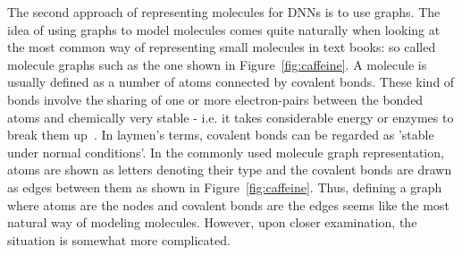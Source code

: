 The second approach of representing molecules for DNNs is to use graphs. The idea of using graphs to model molecules comes quite naturally when looking at the most common way of representing small molecules in text books: so called molecule graphs such as the one shown in Figure~\ref{fig:caffeine}. A molecule is usually defined as a number of atoms connected by covalent bonds. These kind of bonds involve the sharing of one or more electron-pairs between the bonded atoms and chemically very stable - i.e. it takes considerable energy or enzymes to break them up~\cite{Organic-chemistry}. In laymen's terms, covalent bonds can be regarded as 'stable under normal conditions'. In the commonly used molecule graph representation, atoms are shown as letters denoting their type and the covalent bonds are drawn as edges between them as shown in Figure~\ref{fig:caffeine}. Thus, defining a graph where atoms are the nodes and covalent bonds are the edges seems like the most natural way of modeling molecules. However, upon closer examination, the situation is somewhat more complicated.


